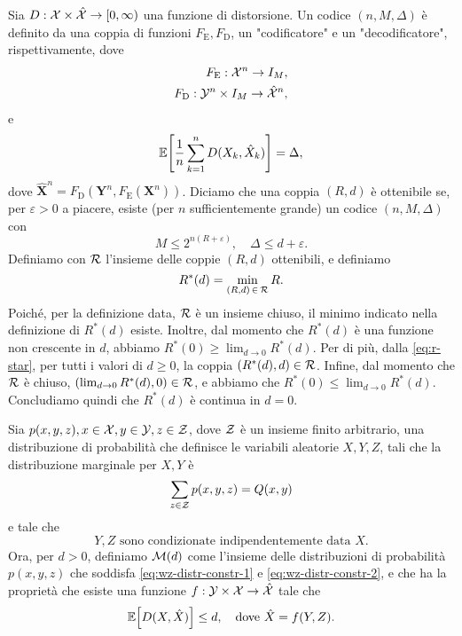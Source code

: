Sia \(D: \mathcal{X}\times\hat{\mathcal{X}} \to [0,\infty)\) una funzione di
distorsione. Un codice \((n,M,\Delta)\) è definito da una coppia di funzioni
\(F_\mathrm{E},F_\mathrm{D}\), un "codificatore" e un "decodificatore",
rispettivamente, dove
\begin{alignat}{1}
    F_\mathrm{E}: \mathcal{X}^n \to I_M &, \\
    F_\mathrm{D}: \mathcal{Y}^n \times I_M \to \hat{\mathcal{X}}^n &,
\end{alignat}
e
\begin{equation}
    \expect{\frac{1}{n} \sum_{k=1}^n D(X_k,\hat{X}_k)} = \Delta,
\end{equation}
dove \(\hat{\bm{X}}^n = F_\mathrm{D}(\bm{Y}^n,F_\mathrm{E}(\bm{X}^n))\).
Diciamo che una coppia \((R,d)\) è ottenibile se, per \(\varepsilon > 0\) a
piacere, esiste (per \(n\) sufficientemente grande) un codice \((n,M,\Delta)\)
con
\begin{equation}
    M \le 2^{n (R + \varepsilon)}, \quad \Delta \le d + \varepsilon .
\end{equation}
Definiamo con \(\mathcal{R}\) l'insieme delle coppie \((R,d)\) ottenibili, e
definiamo
\begin{equation}
    R^{*}(d) = \min_{(R,d)\,\in\,\mathcal{R}} R . \label{eq:r-star}
\end{equation}
Poiché, per la definizione data, \(\mathcal{R}\) è un insieme chiuso, il minimo
indicato nella definizione di \(R^{*}(d)\) esiste. Inoltre, dal momento che
\(R^{*}(d)\) è una funzione non crescente in \(d\), abbiamo \(R^{*}(0) \ge
\lim_{d\to0} R^{*}(d)\). Per di più, dalla \eqref{eq:r-star}, per tutti i
valori di \(d \ge 0\), la coppia \((R^{*}(d), d) \in \mathcal{R}\). Infine, dal
momento che \(\mathcal{R}\) è chiuso, \((\lim_{d\to0} R^{*}(d), 0) \in \mathcal{R}\), e
abbiamo che \(R^{*}(0) \le \lim_{d\to0} R^{*}(d)\). Concludiamo quindi che
\(R^{*}(d)\) è continua in \(d = 0\).

Sia \(p(x,y,z), x \in \mathcal{X}, y \in \mathcal{Y}, z \in \mathcal{Z}\), dove \(\mathcal{Z}\)
è un insieme finito arbitrario, una distribuzione di probabilità che definisce
le variabili aleatorie \(X,Y,Z\), tali che la distribuzione marginale per
\(X,Y\) è
\begin{equation}
    \sum_{z \in \mathcal{Z}} p(x,y,z) = Q(x,y) \label{eq:wz-distr-constr-1}
\end{equation}
e tale che
\begin{equation}
    Y,Z \textrm{ sono condizionate indipendentemente data } X.
    \label{eq:wz-distr-constr-2}
\end{equation}
Ora, per \(d > 0\), definiamo \(\mathcal{M}(d)\) come l'insieme delle distribuzioni
di probabilità \(p(x,y,z)\) che soddisfa \eqref{eq:wz-distr-constr-1} e
\eqref{eq:wz-distr-constr-2}, e che ha la proprietà che esiste una funzione
\(f: \mathcal{Y}\times\mathcal{X} \to \hat{\mathcal{X}}\) tale che
\begin{equation}
    \expect{D(X,\hat{X})} \le d, \quad
    \textrm{dove } \hat{X} = f(Y,Z) .
\end{equation}

